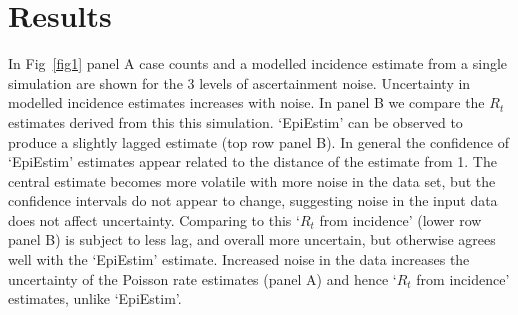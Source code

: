 \documentclass[10pt,letterpaper]{article}
\begin{document}

\section*{Results}

In Fig~\ref{fig1} panel A case counts and a modelled incidence estimate from a single simulation are shown for the 3 levels of ascertainment noise. Uncertainty in modelled incidence estimates increases with noise. In panel B we compare the $R_t$ estimates derived from this this simulation. `EpiEstim' can be observed to produce a slightly lagged estimate (top row panel B). In general the confidence of `EpiEstim' estimates appear related to the distance of the estimate from 1. The central estimate becomes more volatile with more noise in the data set, but the confidence intervals do not appear to change, suggesting noise in the input data does not affect uncertainty. Comparing to this `$R_t$ from incidence' (lower row panel B) is subject to less lag, and overall more uncertain, but otherwise agrees well with the `EpiEstim' estimate. Increased noise in the data increases the uncertainty of the Poisson rate estimates (panel A) and hence `$R_t$ from incidence' estimates, unlike `EpiEstim'.
\end{document}
